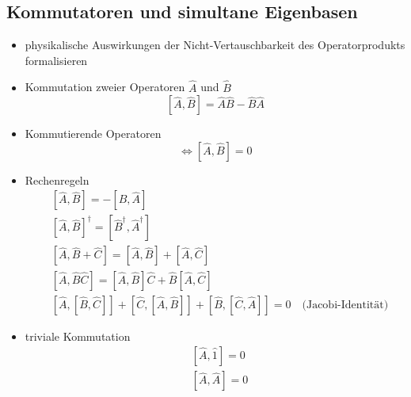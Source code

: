 \documentclass[10pt,article,colorback,accentcolor=tud9d]{scrartcl}
\begin{document}
\begin{fleqn}
\subsection{Kommutatoren und simultane Eigenbasen}
\begin{itemize}
	\item physikalische Auswirkungen der Nicht-Vertauschbarkeit des Operatorprodukts formalisieren 
  \item Kommutation zweier Operatoren $\hat{A}$ und $\hat{B}$
    \begin{equation}
    \left[\hat{A},\hat{B}\right]=\hat{A}\hat{B}-\hat{B}\hat{A}
    \end{equation}
  \item Kommutierende Operatoren
    \begin{equation}
    \Leftrightarrow \left[\hat{A},\hat{B}\right]=0
    \end{equation}
  \item Rechenregeln
    \begin{equation}
    \begin{aligned}
      &\left[\hat{A},\hat{B}\right]=-\left[\hat{B},\hat{A}\right]\\
      &\left[\hat{A},\hat{B}\right]^\dagger=\left[\hat{B}^\dagger,\hat{A}^\dagger\right]\\
      &\left[\hat{A},\hat{B}+\hat{C}\right] =\left[\hat{A},\hat{B}\right]+\left[\hat{A},\hat{C}\right]\\
      &\left[\hat{A},\hat{B}\hat{C}\right]=\left[\hat{A},\hat{B}\right]\hat{C}+\hat{B}\left[\hat{A},\hat{C}\right]\\
      &\left[\hat{A},\left[\hat{B},\hat{C}\right]\right]+
        \left[\hat{C},\left[\hat{A},\hat{B}\right]\right]+
        \left[\hat{B},\left[\hat{C},\hat{A}\right]\right]=0
        \quad\text{(Jacobi-Identität)}
    \end{aligned}
    \end{equation}
  \item triviale Kommutation
    \begin{equation}
    \begin{aligned}
      &\left[\hat{A},\hat{1}\right]=0\\
      &\left[\hat{A},\hat{A}\right]=0
    \end{aligned}
    \end{equation}
\end{itemize}



\end{fleqn}
\end{document}

